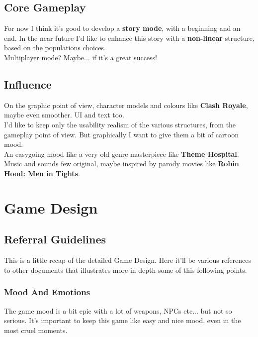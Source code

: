 \documentclass[a4paper]{scrreprt}
\begin{document}
\section{Core Gameplay}
For now I think it's good to develop a \textbf{story mode}, with a beginning and an end. In the near future I'd like to enhance this story with a \textbf{non-linear} structure, based on the populations choices.\\
Multiplayer mode? Maybe... if it's a great success!

\section{Influence}
On the graphic point of view, character models and colours like \textbf{Clash Royale}, maybe even smoother. UI and text too.\\
I'd like to keep only the usability realism of the various structures, from the gameplay point of view. But graphically I want to give them a bit of cartoon mood.\\
An easygoing mood like a very old genre masterpiece like \textbf{Theme Hospital}.\\
Music and sounds few original, maybe inspired by parody movies like \textbf{Robin Hood: Men in Tights}.


\chapter{Game Design} 

\section{Referral Guidelines}
This is a little recap of the detailed Game Design. Here it'll be various references to other documents that illustrates more in depth some of this following points. 

\subsection{Mood And Emotions}
The game mood is a bit epic with a lot of weapons, NPCs etc... but not so serious. It's important to keep this game like easy and nice mood, even in the most cruel moments.
\end{document}
